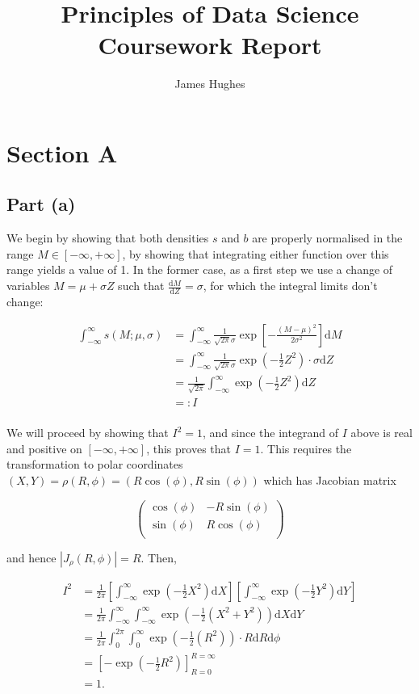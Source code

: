 \documentclass[12pt]{article}
\title{Principles of Data Science Coursework Report}
\author{James Hughes}
\begin{document}
\maketitle
\newpage


\section*{Section A}

\subsection*{Part (a)}

We begin by showing that both densities $s$ and $b$ are properly normalised in the range $M\in [-\infty, +\infty]$, by showing that integrating either function over this range yields a value of 1.
In the former case, as a first step we use a change of variables $M = \mu + \sigma Z$ such that $\frac{\mathrm{d}M}{\mathrm{d}Z} = \sigma$, for which the integral limits don't change:

\begin{align*}
    \int_{-\infty}^\infty s(M;\mu, \sigma) & = \int_{-\infty}^\infty \frac{1}{\sqrt{2\pi}\sigma}\exp \left[-\frac{(M-\mu)^2}{2\sigma^2}\right]\mathrm{d}M\\
        & = \int_{-\infty}^\infty \frac{1}{\sqrt{2\pi}\sigma}\exp(-\frac{1}{2}Z^2)\cdot \sigma \mathrm{d}Z\\
        & = \frac{1}{\sqrt{2\pi}}\int_{-\infty}^\infty\exp(-\frac{1}{2}Z^2)\mathrm{d}Z\\
        & =: I\\
\end{align*}

We will proceed by showing that $I^2=1$, and since the integrand of $I$ above is real and positive on $[-\infty,+\infty]$, this proves that $I=1$.
This requires the transformation to polar coordinates $(X,Y) = \rho(R,\phi) = (R\cos(\phi), R\sin(\phi))$ which has Jacobian matrix

\[
    \begin{pmatrix}
        \cos(\phi) & -R\sin(\phi) \\
        \sin(\phi) & R\cos(\phi) \\
    \end{pmatrix}
\]

and hence $|J_\rho(R,\phi)| = R$. Then,

\begin{align*}
    I^2 & = \frac{1}{2\pi}\left[\int_{-\infty}^\infty\exp(-\frac{1}{2}X^2)\mathrm{d}X\right]\left[\int_{-\infty}^\infty\exp(-\frac{1}{2}Y^2)\mathrm{d}Y\right] \\
        & = \frac{1}{2\pi}\int_{-\infty}^\infty\int_{-\infty}^\infty\exp(-\frac{1}{2}(X^2 + Y^2))\mathrm{d}X\mathrm{d}Y\\
        & = \frac{1}{2\pi}\int_{0}^{2\pi}\int_{0}^\infty\exp(-\frac{1}{2}(R^2))\cdot R \mathrm{d}R\mathrm{d}\phi\\
        & = \left[-\exp(-\frac{1}{2}R^2)\right]_{R=0}^{R=\infty} \\
        & = 1. \\
\end{align*}
\end{document}
